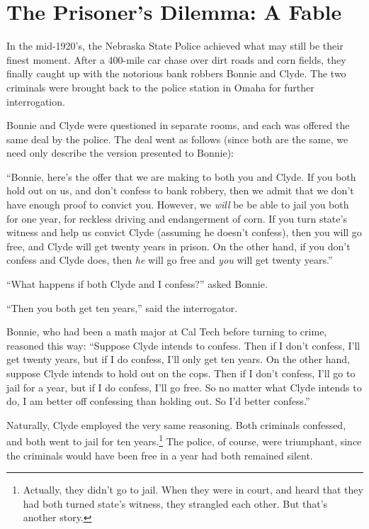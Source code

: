 




\section{The Prisoner's Dilemma: A Fable}

In the mid-1920's, the Nebraska State Police achieved what may still
be their finest moment. After a 400-mile car chase over dirt roads and
corn fields, they finally caught up with the notorious bank robbers
Bonnie and Clyde. The two criminals were brought back to the police
station in Omaha for further interrogation.

Bonnie and Clyde were questioned in separate rooms, and each was
offered the same deal by the police. The deal went as follows (since
both are the same, we need only describe the version presented to
Bonnie):

``Bonnie, here's the offer that we are making to both you and Clyde.
If you both hold out on us, and don't confess to bank robbery, then we
admit that we don't have enough proof to convict you. However, we {\it
will} be be able to jail you both for one year, for reckless driving
and endangerment of corn. If you turn state's witness and help us
convict Clyde (assuming he doesn't confess), then you will go free,
and Clyde will get twenty years in prison. On the other hand, if you
don't confess and Clyde does, then {\it he} will go free and {\it you}
will get twenty years.''

``What happens if both Clyde and I confess?'' asked Bonnie.

``Then you both get ten years,'' said the interrogator.

Bonnie, who had been a math major at Cal Tech before turning to crime,
reasoned this way: ``Suppose Clyde intends to confess.  Then if I
don't confess, I'll get twenty years, but if I do confess, I'll only
get ten years. On the other hand, suppose Clyde intends to hold out on
the cops. Then if I don't confess, I'll go to jail for a year, but if
I do confess, I'll go free.  So no matter what Clyde intends to do, I
am better off confessing than holding out. So I'd better confess.''


Naturally, Clyde employed the very same reasoning. Both criminals
confessed, and both went to jail for ten years.\footnote{Actually,
they didn't go to jail. When they were in court, and heard that they
had both turned state's witness, they strangled each other.  But
that's another story.} The police, of course, were triumphant, since
the criminals would have been free in a year had both remained silent.



